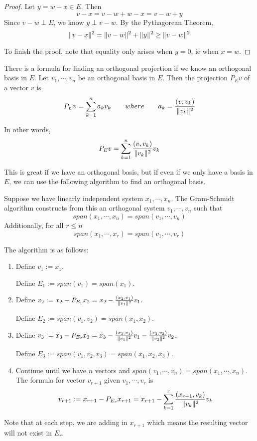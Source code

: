 \begin{proof}
Let $y = w - x \in E$. Then 
$$v - x = v - w + w - x = v - w + y$$
Since $v - w \perp E$, we know $y \perp v - w$. By the Pythagorean Theorem, 
$$\lVert v - x\rVert^{2} = \lVert v - w\rVert^{2} + \lVert y\rVert^{2} \geq \lVert v - w\rVert^{2}$$

To finish the proof, note that equality only arises when $y = 0$, ie when $x = w$. 
\end{proof}

There is a formula for finding an orthogonal projection if we know an orthogonal basis in $E$. Let $v_{1}, \cdots, v_{n}$ be an orthogonal basis in $E$. Then the projection $P_{E} v$ of a vector $v$ is 
$$P_{E} v = \sum_{k=1}^{n} a_{k} v_{k} \qquad where \qquad a_{k} = \frac{(v, v_{k})}{\lVert v_{k}\rVert^{2}}$$

In other words, 
$$P_{E} v = \sum_{k=1}^{n} \frac{(v, v_{k})}{\lVert v_{k}\rVert^{2}} v_{k}$$

This is great if we have an orthogonal basis, but if even if we only have a basis in $E$, we can use the following algorithm to find an orthogonal basis. 

\begin{theorem}
Suppose we have linearly independent system $x_{1}, \cdots, x_{n}$. The Gram-Schmidt algorithm constructs from this an orthogonal system $v_{1}, \cdots, v_{n}$ such that 
$$span(x_{1}, \cdots, x_{n}) = span(v_{1}, \cdots, v_{n})$$
Additionally, for all $r \leq n$ 
$$span(x_{1}, \cdots, x_{r}) = span(v_{1}, \cdots, v_{r})$$

The algorithm is as follows: 
\begin{enumerate}
	\item Define $v_{1} := x_{1}$. 
	
	Define $E_{1} := span(v_{1}) = span(x_{1})$. 
	\item Define $v_{2} := x_{2} - P_{E_{1}} x_{2} = x_{2} - \frac{(x_{2}, v_{1})}{\lVert v_{1}\rVert^{2}} v_{1}$. 
	
	Define $E_{2} := span(v_{1}, v_{2}) = span(x_{1}, x_{2})$. 
	\item Define $v_{3} := x_{3} - P_{E_{2}} x_{3} = x_{3} - \frac{(x_{3}, v_{1})}{\lVert v_{1}\rVert^{2}} v_{1} - \frac{(x_{3}, v_{2})}{\lVert v_{2}\rVert^{2}} v_{2}$. 
	
	Define $E_{3} := span(v_{1}, v_{2}, v_{3}) = span(x_{1}, x_{2}, x_{3})$. 
	
	\item Continue until we have $n$ vectors and $span(v_{1}, \cdots, v_{n}) = span(x_{1}, \cdots, x_{n})$. The formula for vector $v_{r + 1}$ given $v_{1}, \cdots, v_{r}$ is 
	$$ v_{r + 1} := x_{r + 1} - P_{E_{r}} x_{r + 1} = x_{r + 1} - \sum_{k = 1}^{r} \frac{(x_{r + 1}, v_{k})}{\lVert v_{k}\rVert^{2}} v_{k}$$
\end{enumerate}

Note that at each step, we are adding in $x_{r + 1}$ which means the resulting vector will not exist in $E_{r}$. 
\end{theorem}

